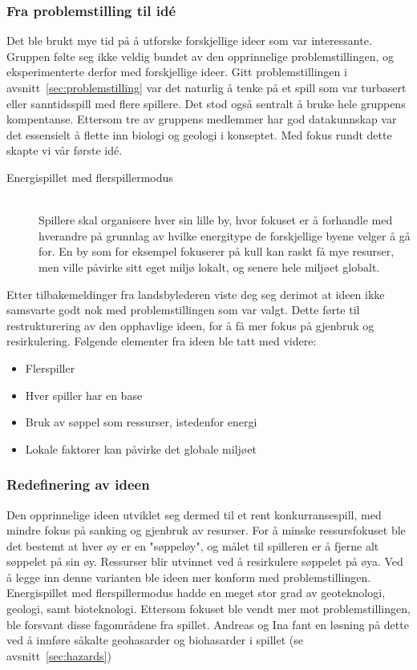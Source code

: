 \subsubsection{Fra problemstilling til idé}
Det ble brukt mye tid på å utforske forskjellige ideer som var
interessante. Gruppen følte seg ikke veldig bundet av den opprinnelige
problemstillingen, og eksperimenterte derfor med forskjellige ideer.
Gitt problemstillingen i avsnitt~\ref{sec:problemstilling} var det
naturlig å tenke på et spill som var turbasert eller sanntidsspill med
flere spillere. Det stod også sentralt å bruke hele gruppens kompentanse. Ettersom tre av gruppens medlemmer har god datakunnskap var det essensielt å flette inn biologi og geologi i konseptet. Med fokus rundt dette skapte vi vår første idé.
\begin{description}
\item[Energispillet med flerspillermodus] \hfill\\
Spillere skal organisere hver sin lille by, hvor fokuset er å forhandle
med hverandre på grunnlag av hvilke energitype de forskjellige byene
velger å gå for. En by som for eksempel fokuserer på kull kan raskt få
mye resurser, men ville påvirke sitt eget miljø lokalt, og senere hele
miljøet globalt.
\end{description}
Etter tilbakemeldinger fra landsbylederen viste deg seg derimot at ideen
ikke samsvarte godt nok med problemstillingen som var valgt. Dette førte
til restrukturering av den opphavlige ideen, for å få mer fokus på
gjenbruk og resirkulering. Følgende elementer fra ideen ble tatt med
videre:
\begin{itemize}
	\item Flerspiller
	\item Hver spiller har en base
	\item Bruk av søppel som ressurser, istedenfor energi
	\item Lokale faktorer kan påvirke det globale miljøet
\end{itemize}
\subsubsection{Redefinering av ideen}
Den opprinnelige ideen utviklet seg dermed til et rent konkurransespill, med
mindre fokus på sanking og gjenbruk av resurser. For å minske ressursfokuset
ble det bestemt at hver øy er en "søppeløy", og målet til spilleren er
å fjerne alt søppelet på sin øy.  Ressurser blir utvinnet ved å
resirkulere søppelet på øya. Ved å legge inn denne varianten ble ideen mer
konform med problemstillingen. Energispillet med flerspillermodus hadde en meget stor grad av geoteknologi, geologi, samt bioteknologi. Ettersom fokuset ble vendt mer mot problemstillingen, ble forsvant disse fagområdene fra spillet. Andreas og Ina fant en løsning på dette ved å innføre såkalte geohasarder og biohasarder i spillet (se avsnitt~\ref{sec:hazards})




